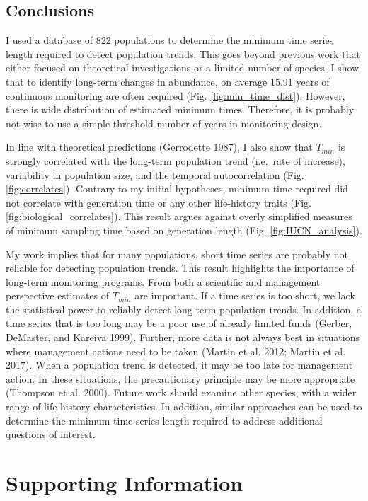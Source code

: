 \documentclass[12pt,]{article}
\begin{document}
\begin{spacing}{2}
\subsection{Conclusions}\label{conclusions}

I used a database of 822 populations to determine the minimum time
series length required to detect population trends. This goes beyond
previous work that either focused on theoretical investigations or a
limited number of species. I show that to identify long-term changes in
abundance, on average 15.91 years of continuous monitoring are often
required (Fig. \ref{fig:min_time_dist}). However, there is wide
distribution of estimated minimum times. Therefore, it is probably not
wise to use a simple threshold number of years in monitoring design.

In line with theoretical predictions (Gerrodette 1987), I also show that
\(T_{min}\) is strongly correlated with the long-term population trend
(i.e.~rate of increase), variability in population size, and the
temporal autocorrelation (Fig. \ref{fig:correlates}). Contrary to my
initial hypotheses, minimum time required did not correlate with
generation time or any other life-history traits (Fig.
\ref{fig:biological_correlates}). This result argues against overly
simplified measures of minimum sampling time based on generation length
(Fig. \ref{fig:IUCN_analysis}).

My work implies that for many populations, short time series are
probably not reliable for detecting population trends. This result
highlights the importance of long-term monitoring programs. From both a
scientific and management perspective estimates of \(T_{min}\) are
important. If a time series is too short, we lack the statistical power
to reliably detect long-term population trends. In addition, a time
series that is too long may be a poor use of already limited funds
(Gerber, DeMaster, and Kareiva 1999). Further, more data is not always
best in situations where management actions need to be taken (Martin et
al. 2012; Martin et al. 2017). When a population trend is detected, it
may be too late for management action. In these situations, the
precautionary principle may be more appropriate (Thompson et al. 2000).
Future work should examine other species, with a wider range of
life-history characteristics. In addition, similar approaches can be
used to determine the minimum time series length required to address
additional questions of interest.

\section{Supporting Information}\label{supporting-information}


\end{spacing}
\end{document}
